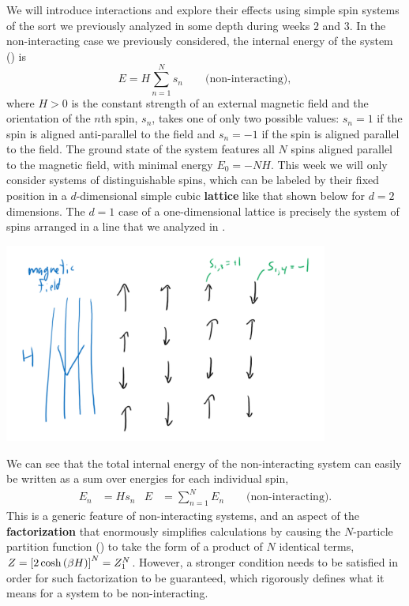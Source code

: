 We will introduce interactions and explore their effects using simple spin systems of the sort we previously analyzed in some depth during weeks $2$ and $3$.
In the non-interacting case we previously considered, the internal energy of the system () is
\begin{equation*}
  E = H \sum_{n = 1}^N s_n \qquad \mbox{(non-interacting)},
\end{equation*}
where $H > 0$ is the constant strength of an external magnetic field and the orientation of the $n$th spin, $s_n$, takes one of only two possible values: $s_n = 1$ if the spin is aligned anti-parallel to the field and $s_n = -1$ if the spin is aligned parallel to the field.
The ground state of the system features all $N$ spins aligned parallel to the magnetic field, with minimal energy $E_0 = -NH$.
This week we will only consider systems of distinguishable spins, which can be labeled by their fixed position in a $d$-dimensional simple cubic \textbf{lattice} like that shown below for $d = 2$ dimensions.
The $d = 1$ case of a one-dimensional lattice is precisely the system of spins arranged in a line that we analyzed in .

\begin{center}\includegraphics[width=0.8\textwidth]{figs/week10_spins.pdf}\end{center}

We can see that the total internal energy of the non-interacting system can easily be written as a sum over energies for each individual spin,
\begin{align*}
  E_n & = H s_n &
  E & = \sum_{n = 1}^N E_n \qquad \mbox{(non-interacting)}.
\end{align*}
This is a generic feature of non-interacting systems, and an aspect of the \textbf{factorization} that enormously simplifies calculations by causing the $N$-particle partition function () to take the form of a product of $N$ identical terms, $Z = \left[2\cosh\left(\beta H\right)\right]^N = Z_1^N$.
However, a stronger condition needs to be satisfied in order for such factorization to be guaranteed, which rigorously defines what it means for a system to be non-interacting.

